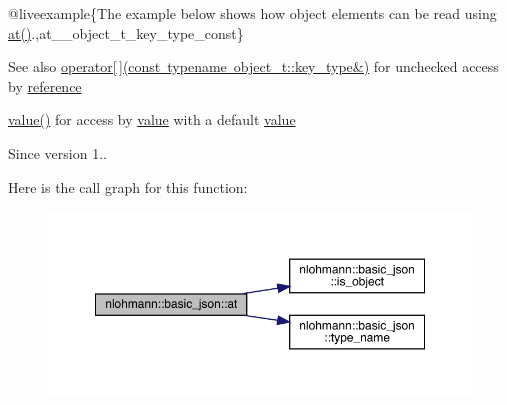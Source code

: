 @liveexample\{The example below shows how object elements can be read using {\ttfamily \mbox{\hyperlink{classnlohmann_1_1basic__json_a73ae333487310e3302135189ce8ff5d8}{at()}}}.,at\+\_\+\+\_\+object\+\_\+t\+\_\+key\+\_\+type\+\_\+const\}

\begin{DoxySeeAlso}{See also}
\mbox{\hyperlink{classnlohmann_1_1basic__json_a233b02b0839ef798942dd46157cc0fe6}{operator\mbox{[}$\,$\mbox{]}(const typename object\+\_\+t\+::key\+\_\+type\&)}} for unchecked access by \mbox{\hyperlink{classnlohmann_1_1basic__json_ac6a5eddd156c776ac75ff54cfe54a5bc}{reference}} 

\mbox{\hyperlink{classnlohmann_1_1basic__json_af9c51328fbe1da75eca750be3009917a}{value()}} for access by \mbox{\hyperlink{classnlohmann_1_1basic__json_af9c51328fbe1da75eca750be3009917a}{value}} with a default \mbox{\hyperlink{classnlohmann_1_1basic__json_af9c51328fbe1da75eca750be3009917a}{value}}
\end{DoxySeeAlso}
\begin{DoxySince}{Since}
version 1.. 
\end{DoxySince}
Here is the call graph for this function\+:
\nopagebreak
\begin{figure}[H]
\begin{center}
\leavevmode
\includegraphics[width=350pt]{classnlohmann_1_1basic__json_acac9d438c9bb12740dcdb01069293a34_cgraph}
\end{center}
\end{figure}
\mbox{\label{classnlohmann_1_1basic__json_a8ab61397c10f18b305520da7073b2b45}} 

